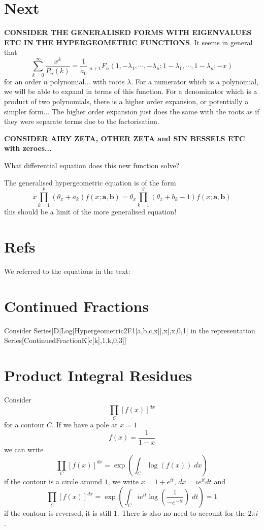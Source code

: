 \documentclass{article}
\begin{document}
\section{Next}
\textbf{CONSIDER THE GENERALISED FORMS WITH EIGENVALUES ETC IN THE HYPERGEOMETRIC FUNCTIONS}.
It seems in general that 
$$
\sum_{k=0}^\infty \frac{x^k}{P_n(k)} = \frac{1}{a_0}\;_{n+1}F_{n}(1,-\lambda_1,\cdots,-\lambda_n;1-\lambda_1,\cdots,1-\lambda_n;-x)
$$
for an order $n$ polynomial... with roots $\lambda$. For a numerator which is a polynomial, we will be able to expand in terms of this function. For a denominator which is a product of two polynomials, there is a higher order expansion, or potentially a simpler form... The higher order expansion just does the same with the roots as if they were separate terms due to the factorisation.

\textbf{CONSIDER AIRY ZETA, OTHER ZETA and SIN BESSELS ETC with zeroes...}

What differential equation does this new function solve? 

The generalised hypergeometric equation is of the form 
$$
x \prod_{k=1}^p ( \theta_x + a_k) f(x;\mathbf{a,b}) = \theta_x \prod_{k=1}^q (\theta_x + b_k -1) f(x;\mathbf{a,b})
$$
this should be a limit of the more generalised equation!

\section{Refs}
We referred to the equations in the text:



\section{Continued Fractions}
Consider Series[D[Log[Hypergeometric2F1[a,b,c,x]],x],{x,0,1}] in the representation Series[ContinuedFractionK[c[k],1,{k,0,3}]]



\section{Product Integral Residues}
Consider
$$
\prod_{C} [f(x)]^{dx}
$$
for a contour $C$. If we have a pole at $x=1$
$$
f(x) = \frac{1}{1-x}
$$
we can write 
$$
\prod_{C} [f(x)]^{dx} = \exp\left( \int_{C} \log(f(x)) \; dx \right)
$$
if the contour is a circle around $1$, we write $x = 1 + e^{i t}$, $dx = i e^{it} dt$ and 
$$
\prod_{C} [f(x)]^{dx} = \exp\left( \int_{C} i e^{it} \log(\frac{1}{-e^{-i t}}) \; dt \right) = 1
$$
if the contour is reversed, it is still $1$. There is also no need to account for the $2 \pi i$.
\end{document}
